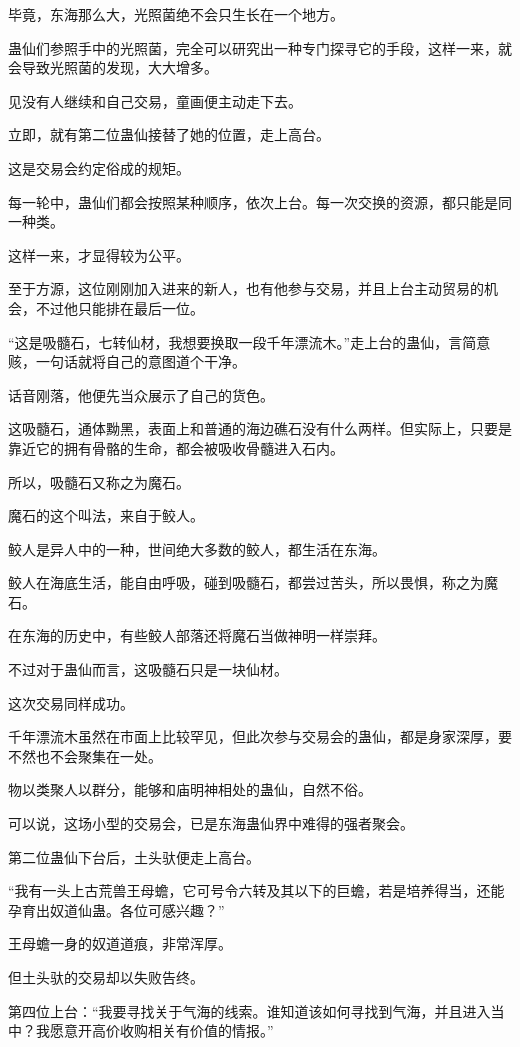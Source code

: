 \begin{this_body}
毕竟，东海那么大，光照菌绝不会只生长在一个地方。

蛊仙们参照手中的光照菌，完全可以研究出一种专门探寻它的手段，这样一来，就会导致光照菌的发现，大大增多。

见没有人继续和自己交易，童画便主动走下去。

立即，就有第二位蛊仙接替了她的位置，走上高台。

这是交易会约定俗成的规矩。

每一轮中，蛊仙们都会按照某种顺序，依次上台。每一次交换的资源，都只能是同一种类。

这样一来，才显得较为公平。

至于方源，这位刚刚加入进来的新人，也有他参与交易，并且上台主动贸易的机会，不过他只能排在最后一位。

“这是吸髓石，七转仙材，我想要换取一段千年漂流木。”走上台的蛊仙，言简意赅，一句话就将自己的意图道个干净。

话音刚落，他便先当众展示了自己的货色。

这吸髓石，通体黝黑，表面上和普通的海边礁石没有什么两样。但实际上，只要是靠近它的拥有骨骼的生命，都会被吸收骨髓进入石内。

所以，吸髓石又称之为魔石。

魔石的这个叫法，来自于鲛人。

鲛人是异人中的一种，世间绝大多数的鲛人，都生活在东海。

鲛人在海底生活，能自由呼吸，碰到吸髓石，都尝过苦头，所以畏惧，称之为魔石。

在东海的历史中，有些鲛人部落还将魔石当做神明一样崇拜。

不过对于蛊仙而言，这吸髓石只是一块仙材。

这次交易同样成功。

千年漂流木虽然在市面上比较罕见，但此次参与交易会的蛊仙，都是身家深厚，要不然也不会聚集在一处。

物以类聚人以群分，能够和庙明神相处的蛊仙，自然不俗。

可以说，这场小型的交易会，已是东海蛊仙界中难得的强者聚会。

第二位蛊仙下台后，土头驮便走上高台。

“我有一头上古荒兽王母蟾，它可号令六转及其以下的巨蟾，若是培养得当，还能孕育出奴道仙蛊。各位可感兴趣？”

王母蟾一身的奴道道痕，非常浑厚。

但土头驮的交易却以失败告终。

第四位上台：“我要寻找关于气海的线索。谁知道该如何寻找到气海，并且进入当中？我愿意开高价收购相关有价值的情报。”


\end{this_body}
